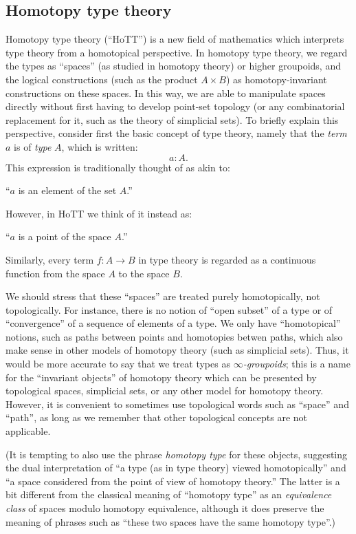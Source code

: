 {\subsection*{Homotopy type theory}

Homotopy type theory (``HoTT'') is a new field of mathematics which interprets type theory from a homotopical perspective.
In homotopy type theory, we regard the types as ``spaces'' (as studied in homotopy theory) or higher groupoids, and the logical constructions (such as the product $A\times B$) as homotopy-invariant constructions on these spaces.
In this way, we are able to manipulate spaces directly without first having to develop point-set topology (or any combinatorial replacement for it, such as the theory of simplicial sets).
To briefly explain this perspective, consider first the basic concept of type theory, namely that
the \emph{term} $a$ is of \emph{type} $A$, which is written:
$$
  a:A.
$$
This expression is traditionally thought of as akin to:
\begin{center}
``$a$ is an element of the set $A$.''
\end{center}
However, in HoTT we think of it instead as:
\begin{center}
``$a$ is a point of the space $A$.''
\end{center}
Similarly, every term $f : A\to B$ in type theory is regarded as a continuous function from the space $A$ to the space $B$.

We should stress that these ``spaces'' are treated purely homotopically, not topologically.
For instance, there is no notion of ``open subset'' of a type or of ``convergence'' of a sequence of elements of a type.
We only have ``homotopical'' notions, such as paths between points and homotopies betwen paths, which also make sense in other models of homotopy theory (such as simplicial sets).
Thus, it would be more accurate to say that we treat types as \emph{$\infty$-groupoids}; this is a name for the ``invariant objects'' of homotopy theory which can be presented by topological spaces, simplicial sets, or any other model for homotopy theory.
However, it is convenient to sometimes use topological words such as ``space'' and ``path'', as long as we remember that other topological concepts are not applicable.

(It is tempting to also use the phrase \emph{homotopy type} for these objects, suggesting the dual interpretation of ``a type (as in type theory) viewed homotopically'' and ``a space considered from the point of view of homotopy theory.''
The latter is a bit different from the classical meaning of ``homotopy type'' as an \emph{equivalence class} of spaces modulo homotopy equivalence, although it does preserve the meaning of phrases such as ``these two spaces have the same homotopy type''.)

}
